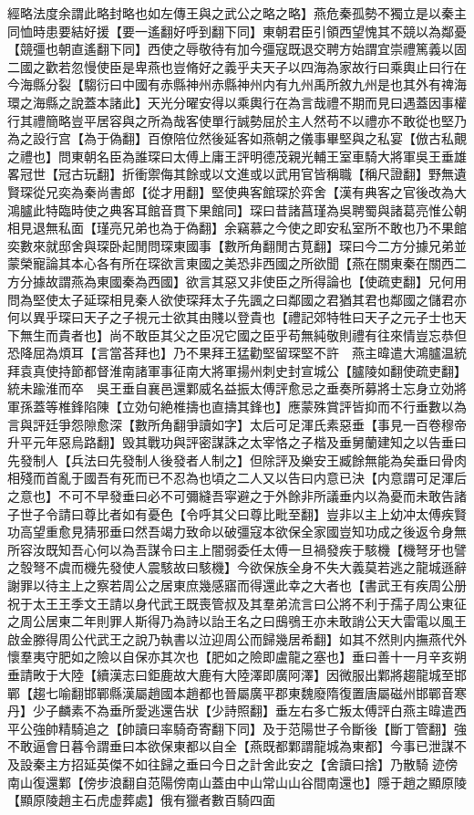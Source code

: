 經略法度余謂此略封略也如左傳王與之武公之略之略】燕危秦孤勢不獨立是以秦主同恤時患要結好援【要一遙翻好呼到翻下同】東朝君臣引領西望愧其不競以為鄰憂【競彊也朝直遙翻下同】西使之辱敬待有加今彊寇既退交聘方始謂宜崇禮篤義以固二國之歡若忽慢使臣是卑燕也豈脩好之義乎夫天子以四海為家故行曰乘輿止曰行在今海縣分裂【騶衍曰中國有赤縣神州赤縣神州内有九州禹所敘九州是也其外有禆海環之海縣之說蓋本諸此】天光分曜安得以乘輿行在為言哉禮不期而見曰遇蓋因事權行其禮簡略豈平居容與之所為哉客使單行誠勢屈於主人然苟不以禮亦不敢從也堅乃為之設行宫【為于偽翻】百僚陪位然後延客如燕朝之儀事畢堅與之私宴【倣古私覿之禮也】問東朝名臣為誰琛曰太傅上庸王評明德茂親光輔王室車騎大將軍吳王垂雄畧冠世【冠古玩翻】折衝禦侮其餘或以文進或以武用官皆稱職【稱尺證翻】野無遺賢琛從兄奕為秦尚書郎【從才用翻】堅使典客館琛於弈舍【漢有典客之官後改為大鴻臚此特臨時使之典客耳館音貫下果館同】琛曰昔諸菖瑾為吳聘蜀與諸葛亮惟公朝相見退無私面【瑾亮兄弟也為于偽翻】余竊慕之今使之即安私室所不敢也乃不果館奕數來就邸舍與琛卧起閒問琛東國事【數所角翻閒古莧翻】琛曰今二方分據兄弟並蒙榮寵論其本心各有所在琛欲言東國之美恐非西國之所欲聞【燕在關東秦在關西二方分據故謂燕為東國秦為西國】欲言其惡又非使臣之所得論也【使疏吏翻】兄何用問為堅使太子延琛相見秦人欲使琛拜太子先諷之曰鄰國之君猶其君也鄰國之儲君亦何以異乎琛曰天子之子視元士欲其由賤以登貴也【禮記郊特牲曰天子之元子士也天下無生而貴者也】尚不敢臣其父之臣况它國之臣乎苟無純敬則禮有往來情豈忘恭但恐降屈為煩耳【言當荅拜也】乃不果拜王猛勸堅留琛堅不許　燕主暐遣大鴻臚温統拜袁真使持節都督淮南諸軍事征南大將軍揚州刺史封宣城公【臚陵如翻使疏吏翻】統未踰淮而卒　吳王垂自襄邑還鄴威名益振太傅評愈忌之垂奏所募將士忘身立効將軍孫蓋等椎鋒陷陳【立効句絶椎擣也直擣其鋒也】應蒙殊賞評皆抑而不行垂數以為言與評廷爭怨隙愈深【數所角翻爭讀如字】太后可足渾氏素惡垂【事見一百卷穆帝升平元年惡烏路翻】毁其戰功與評密謀誅之太宰恪之子楷及垂舅蘭建知之以告垂曰先發制人【兵法曰先發制人後發者人制之】但除評及樂安王臧餘無能為矣垂曰骨肉相殘而首亂于國吾有死而已不忍為也頃之二人又以告曰内意已決【内意謂可足渾后之意也】不可不早發垂曰必不可彌縫吾寜避之于外餘非所議垂内以為憂而未敢告諸子世子令請曰尊比者如有憂色【令呼其父曰尊比毗至翻】豈非以主上幼冲太傅疾賢功高望重愈見猜邪垂曰然吾竭力致命以破彊寇本欲保全家國豈知功成之後返令身無所容汝既知吾心何以為吾謀令曰主上闇弱委任太傅一旦禍發疾于駭機【機弩牙也譬之彀弩不虞而機先發使人震駭故曰駭機】今欲保族全身不失大義莫若逃之龍城遜辭謝罪以待主上之察若周公之居東庶幾感寤而得還此幸之大者也【書武王有疾周公册祝于太王王季文王請以身代武王既喪管叔及其羣弟流言曰公將不利于孺子周公東征之周公居東二年則罪人斯得乃為詩以詒王名之曰䲭鴞王亦未敢誚公天大雷電以風王啟金滕得周公代武王之說乃執書以泣迎周公而歸幾居希翻】如其不然則内撫燕代外懷羣夷守肥如之險以自保亦其次也【肥如之險即盧龍之塞也】垂曰善十一月辛亥朔垂請畋于大陸【續漢志曰鉅鹿故大鹿有大陸澤即廣阿澤】因微服出鄴將趨龍城至邯鄲【趨七喻翻邯鄲縣漢屬趙國本趙都也晉屬廣平郡東魏廢隋復置唐屬磁州邯鄲音寒丹】少子麟素不為垂所愛逃還告狀【少詩照翻】垂左右多亡叛太傅評白燕主暐遣西平公強帥精騎追之【帥讀曰率騎奇寄翻下同】及于范陽世子令斷後【斷丁管翻】強不敢逼會日暮令謂垂曰本欲保東都以自全【燕既都鄴謂龍城為東都】今事已泄謀不及設秦主方招延英傑不如往歸之垂曰今日之計舍此安之【舍讀曰捨】乃散騎迹傍南山復還鄴【傍步浪翻自范陽傍南山蓋由中山常山山谷間南還也】隱于趙之顯原陵【顯原陵趙主石虎虚葬處】俄有獵者數百騎四面